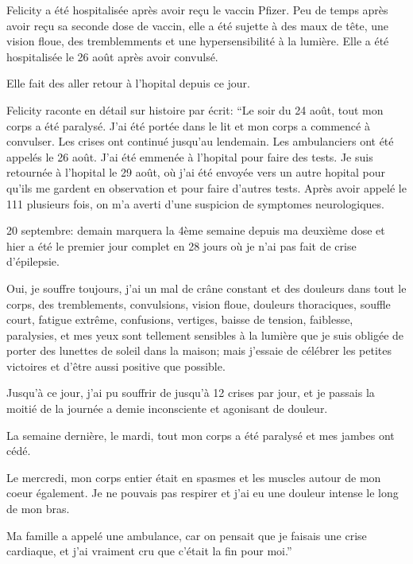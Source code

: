 Felicity a été hospitalisée après avoir reçu le vaccin Pfizer. Peu de temps
après avoir reçu sa seconde dose de vaccin, elle a été sujette à des maux de
tête, une vision floue, des tremblemments et une hypersensibilité à la
lumière. Elle a été hospitalisée le 26 août après avoir convulsé.

Elle fait des aller retour à l'hopital depuis ce jour.

Felicity raconte en détail sur histoire par écrit: “Le soir du 24 août, tout mon
corps a été paralysé. J'ai été portée dans le lit et mon corps a commencé à
convulser. Les crises ont continué jusqu'au lendemain. Les ambulanciers ont été
appelés le 26 août. J'ai été emmenée à l'hopital pour faire des tests. Je suis
retournée à l'hopital le 29 août, où j'ai été envoyée vers un autre hopital pour
qu'ils me gardent en observation et pour faire d'autres tests. Après avoir
appelé le 111 plusieurs fois, on m'a averti d'une suspicion de symptomes
neurologiques.

20 septembre: demain marquera la 4ème semaine depuis ma deuxième dose et hier a
été le premier jour complet en 28 jours où je n'ai pas fait de crise
d'épilepsie.

Oui, je souffre toujours, j'ai un mal de crâne constant et des douleurs dans
tout le corps, des tremblements, convulsions, vision floue, douleurs
thoraciques, souffle court, fatigue extrême, confusions, vertiges, baisse de
tension, faiblesse, paralysies, et mes yeux sont tellement sensibles à la
lumière que je suis obligée de porter des lunettes de soleil dans la maison;
mais j'essaie de célébrer les petites victoires et d'être aussi positive que
possible.

Jusqu'à ce jour, j'ai pu souffrir de jusqu'à 12 crises par jour, et je passais
la moitié de la journée a demie inconsciente et agonisant de douleur.

La semaine dernière, le mardi, tout mon corps a été paralysé et mes jambes ont
cédé.

Le mercredi, mon corps entier était en spasmes et les muscles autour de mon
coeur également. Je ne pouvais pas respirer et j'ai eu une douleur intense le
long de mon bras.

Ma famille a appelé une ambulance, car on pensait que je faisais une crise
cardiaque, et j'ai vraiment cru que c'était la fin pour moi.”

